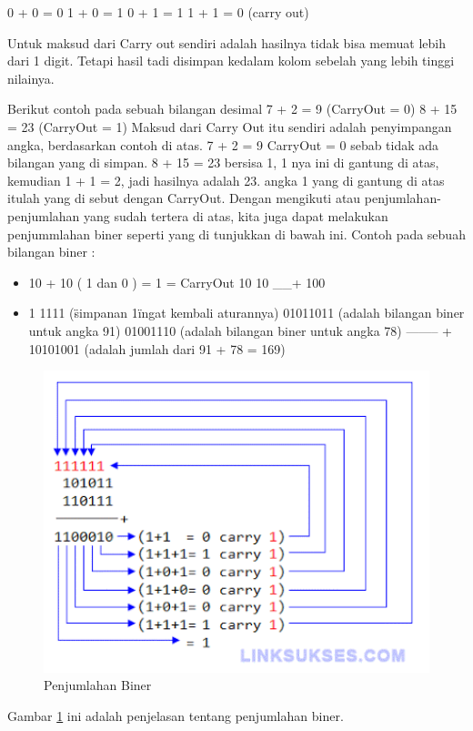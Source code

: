 0 + 0 = 0
1 + 0 = 1
0 + 1 = 1
1 + 1 = 0 (carry out) 

Untuk maksud dari Carry out sendiri adalah hasilnya tidak bisa memuat lebih dari 1 digit. Tetapi  hasil tadi disimpan kedalam kolom sebelah yang lebih tinggi nilainya.

Berikut contoh pada sebuah bilangan desimal
7 + 2 = 9 (CarryOut = 0)
8 + 15 = 23 (CarryOut = 1)
Maksud dari Carry Out itu sendiri adalah penyimpangan angka, berdasarkan contoh di atas. 7 + 2 = 9 CarryOut = 0 sebab tidak ada bilangan yang di simpan. 8 + 15 = 23 bersisa 1, 1 nya ini di gantung di atas, kemudian  1 + 1 = 2, jadi hasilnya adalah 23. angka 1 yang di gantung di atas itulah yang di sebut dengan CarryOut. Dengan mengikuti atau penjumlahan- penjumlahan yang sudah tertera di atas, kita juga dapat melakukan penjummlahan biner seperti yang di tunjukkan di bawah ini.
Contoh pada sebuah bilangan biner :
\begin{itemize}
	\item 10 + 10 ( 1 dan 0 ) =
	  1 = CarryOut
	  10
	  10
	  __+
	  100
	\item 1 1111 (\"simpanan 1\" ingat kembali aturannya)
	  01011011 (adalah bilangan biner untuk angka 91)
	  01001110 (adalah bilangan biner untuk angka 78)
	  -------- +
	  10101001 (adalah jumlah dari 91 + 78 = 169)
\end{itemize}

	\begin{figure} [ht]
	\centerline{\includegraphics[width=1\textwidth]{figures/Penjumlahan-Biner.gif}}
	\caption{Penjumlahan Biner}
	\label{Penjumlahan-Biner}
	\end{figure}
Gambar \ref{Penjumlahan-Biner} ini adalah penjelasan tentang penjumlahan biner.

